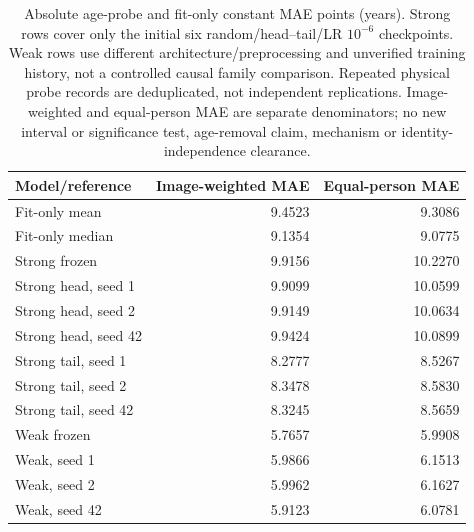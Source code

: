 \begin{table}[!t]
\caption{Absolute age-probe and fit-only constant MAE points (years). Strong rows cover only the initial six random/head--tail/LR $10^{-6}$ checkpoints. Weak rows use different architecture/preprocessing and unverified training history, not a controlled causal family comparison. Repeated physical probe records are deduplicated, not independent replications. Image-weighted and equal-person MAE are separate denominators; no new interval or significance test, age-removal claim, mechanism or identity-independence clearance.}
\label{tab:age-probe-absolute-points}
\centering\scriptsize
\begin{tabular}{@{}lrr@{}}
\toprule
Model/reference & Image-weighted MAE & Equal-person MAE \\
\midrule
Fit-only mean & 9.4523 & 9.3086 \\
Fit-only median & 9.1354 & 9.0775 \\
Strong frozen & 9.9156 & 10.2270 \\
Strong head, seed 1 & 9.9099 & 10.0599 \\
Strong head, seed 2 & 9.9149 & 10.0634 \\
Strong head, seed 42 & 9.9424 & 10.0899 \\
Strong tail, seed 1 & 8.2777 & 8.5267 \\
Strong tail, seed 2 & 8.3478 & 8.5830 \\
Strong tail, seed 42 & 8.3245 & 8.5659 \\
Weak frozen & 5.7657 & 5.9908 \\
Weak, seed 1 & 5.9866 & 6.1513 \\
Weak, seed 2 & 5.9962 & 6.1627 \\
Weak, seed 42 & 5.9123 & 6.0781 \\
\bottomrule
\end{tabular}
\end{table}
